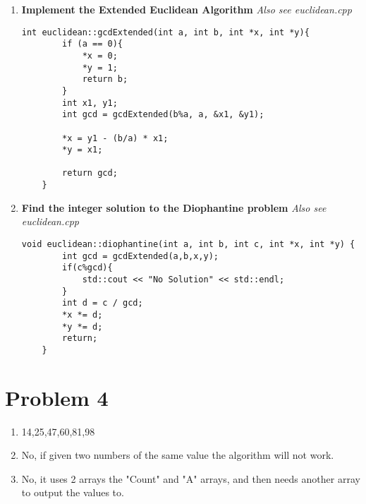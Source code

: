 \documentclass[12pt,letterpaper]{article}
\begin{document}
\begin{enumerate}
    \item
    \textbf{Implement the Extended Euclidean Algorithm}
    \textit{Also see euclidean.cpp}
     \begin{lstlisting}[style = C++]
    int euclidean::gcdExtended(int a, int b, int *x, int *y){  
        if (a == 0){  
            *x = 0;  
            *y = 1;  
            return b;  
        }  
        int x1, y1; 
        int gcd = gcdExtended(b%a, a, &x1, &y1);  
    
        *x = y1 - (b/a) * x1;  
        *y = x1;  
  
        return gcd;
    }
    \end{lstlisting}
    \item
    \textbf{Find the integer solution to the Diophantine problem}
    \textit{Also see euclidean.cpp}
    
        

         \begin{lstlisting}[style = C++]
    void euclidean::diophantine(int a, int b, int c, int *x, int *y) {
        int gcd = gcdExtended(a,b,x,y);
        if(c%gcd){
            std::cout << "No Solution" << std::endl;
        }
        int d = c / gcd;
        *x *= d;
        *y *= d;
        return;
    }
        \end{lstlisting}


\end{enumerate}
\section*{Problem 4}
\begin{enumerate}
    \item 14,25,47,60,81,98
    \item No, if given two numbers of the same value the algorithm will not work.
    \item No, it uses 2 arrays the "Count" and "A" arrays, and then needs another array to output the values to.
\end{enumerate}
\end{document}
